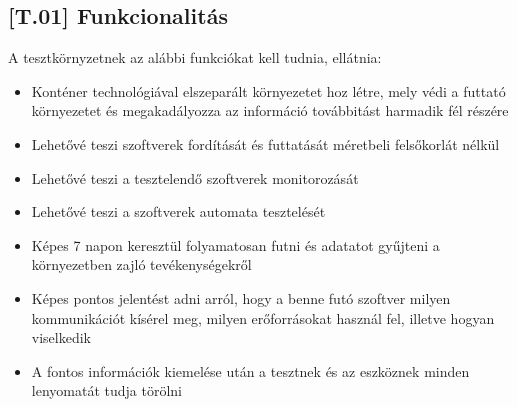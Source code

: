 \documentclass{scrreprt}
\begin{document}
\subsection{[T.01] Funkcionalitás} \label{T.01}
A tesztkörnyzetnek az alábbi funkciókat kell tudnia, ellátnia:
\begin{itemize}
      \item Konténer technológiával elszeparált környezetet hoz létre, mely védi a futtató környezetet és megakadályozza az információ továbbitást harmadik fél részére
      \item Lehetővé teszi szoftverek fordítását és futtatását méretbeli felsőkorlát nélkül
      \item Lehetővé teszi a tesztelendő szoftverek monitorozását
      \item Lehetővé teszi a szoftverek automata tesztelését
      \item Képes 7 napon keresztül folyamatosan futni és adatatot gyűjteni a környezetben zajló tevékenységekről
      \item Képes pontos jelentést adni arról, hogy a benne futó szoftver milyen kommunikációt kísérel meg, milyen erőforrásokat használ fel, illetve hogyan viselkedik
      \item A fontos információk kiemelése után a tesztnek és az eszköznek minden lenyomatát tudja törölni
\end{itemize}
\end{document}
